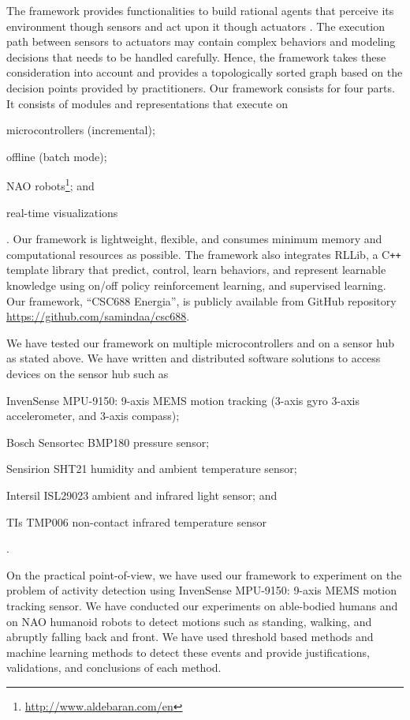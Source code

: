 \documentclass{llncs}
\begin{document}
\begin{sloppy}
The framework provides functionalities to build  rational agents that perceive its
environment though sensors and act upon it though actuators \cite{russel2009}. The execution path
between sensors to actuators may contain complex behaviors and modeling decisions that needs to be
handled carefully. Hence, the framework takes these consideration into account and provides a
topologically sorted graph based on the decision points provided by practitioners. Our
framework consists for four parts. It consists of modules and representations that execute on
\begin{inparaenum}[(1)]\item microcontrollers (incremental); \item offline (batch mode); \item NAO
robots\footnote{\url{http://www.aldebaran.com/en}}; and \item real-time
visualizations\end{inparaenum}. Our framework is lightweight, flexible, and consumes minimum memory
and computational resources as
possible. The framework also integrates RLLib, a C\texttt{++} template library that predict,
control, learn behaviors, and represent learnable knowledge using on/off policy reinforcement
learning, and supervised learning. Our framework, ``CSC688 Energia'', is publicly available from
GitHub repository \url{https://github.com/samindaa/csc688}.

We have tested our framework on multiple microcontrollers and on a sensor hub as stated above. We
have written and distributed software solutions to access devices on the sensor hub such as
\begin{inparaenum}[(1)] \item InvenSense MPU-9150: 9-axis MEMS motion tracking (3-axis gyro
3-axis accelerometer, and 3-axis compass); \item Bosch Sensortec BMP180 pressure sensor; \item
Sensirion SHT21 humidity and ambient temperature sensor; \item Intersil ISL29023 ambient and
infrared light sensor; and \item TIs TMP006 non-contact infrared temperature sensor\end{inparaenum}.

On the practical point-of-view, we have used our framework to experiment on the problem of activity
detection using InvenSense MPU-9150: 9-axis MEMS motion tracking sensor. We have conducted our
experiments on able-bodied humans and on NAO humanoid robots to detect motions such as standing,
walking, and abruptly falling back and front. We have used threshold based methods and machine
learning methods to detect these events and provide justifications, validations, and conclusions of
each method.  



\end{sloppy}
\end{document}
